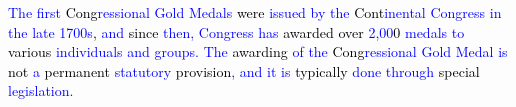 \begin{tcolorbox}
    \textcolor{blue}{The} \textcolor{blue}{first} \textcolor{black}{Cong}\textcolor{blue}{r}\textcolor{blue}{essional} \textcolor{blue}{Gold} \textcolor{blue}{Med}\textcolor{blue}{als} \textcolor{black}{were} \textcolor{blue}{issued} \textcolor{blue}{by} \textcolor{blue}{the} \textcolor{black}{Cont}\textcolor{blue}{inental} \textcolor{blue}{Congress} \textcolor{blue}{in} \textcolor{blue}{the} \textcolor{blue}{late} \textcolor{black}{}\textcolor{blue}{1}\textcolor{blue}{7}\textcolor{blue}{0}\textcolor{blue}{0}\textcolor{blue}{s}\textcolor{black}{,} \textcolor{blue}{and} \textcolor{black}{since} \textcolor{blue}{then}\textcolor{blue}{,} \textcolor{blue}{Congress} \textcolor{blue}{has} \textcolor{black}{awarded} \textcolor{black}{over} \textcolor{blue}{}\textcolor{blue}{2}\textcolor{blue}{,}\textcolor{blue}{0}\textcolor{blue}{0}\textcolor{black}{0} \textcolor{blue}{med}\textcolor{blue}{als} \textcolor{blue}{to} \textcolor{black}{various} \textcolor{blue}{individuals} \textcolor{blue}{and} \textcolor{blue}{groups}\textcolor{blue}{.} \textcolor{blue}{The} \textcolor{black}{award}\textcolor{black}{ing} \textcolor{blue}{of} \textcolor{blue}{the} \textcolor{black}{Cong}\textcolor{blue}{r}\textcolor{blue}{essional} \textcolor{blue}{Gold} \textcolor{blue}{Medal} \textcolor{blue}{is} \textcolor{black}{not} \textcolor{blue}{a} \textcolor{black}{permanent} \textcolor{blue}{stat}\textcolor{blue}{ut}\textcolor{blue}{ory} \textcolor{black}{provision}\textcolor{blue}{,} \textcolor{blue}{and} \textcolor{blue}{it} \textcolor{blue}{is} \textcolor{black}{typically} \textcolor{blue}{done} \textcolor{blue}{through} \textcolor{black}{special} \textcolor{blue}{legisl}\textcolor{blue}{ation}\textcolor{blue}{.}
    

\end{tcolorbox}

